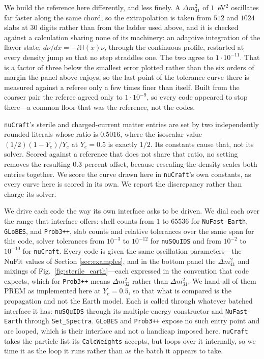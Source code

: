 \documentclass[final,5p,times,twocolumn,sort,compress]{elsarticle}
\newcommand{\fig}{Fig.}
\newcommand{\figu}[1]{\fig~\ref{fig:#1}}
\begin{document}
We build the reference here differently, and less finely.  A $\Delta m^2_{41}$ of $1$~eV$^2$ oscillates far faster along the same chord, so the extrapolation is taken from $512$ and $1024$ slabs at $30$ digits rather than from the ladder used above, and it is checked against a calculation sharing none of its machinery: an adaptive integration of the flavor state, $d\nu/dx = -i \mathbb{H}(x) \nu$, through the continuous profile, restarted at every density jump so that no step straddles one.  The two agree to $1 \cdot 10^{-11}$.  That is a factor of three below the smallest error plotted rather than the six orders of margin the panel above enjoys, so the last point of the tolerance curve there is measured against a referee only a few times finer than itself.  Built from the coarser pair the referee agreed only to $1 \cdot 10^{-9}$, so every code appeared to stop there---a common floor that was the reference, not the codes.

{\tt nuCraft}'s sterile and charged-current matter entries are set by two independently rounded literals whose ratio is $0.5016$, where the isoscalar value $(1/2)(1 - Y_e)/Y_e$ at $Y_e = 0.5$ is exactly $1/2$.  Its constants cause that, not its solver.  Scored against a reference that does not share that ratio, no setting removes the resulting $0.3$ percent offset, because rescaling the density scales both entries together.  We score the curve drawn here in {\tt nuCraft}'s own constants, as every curve here is scored in its own.  We report the discrepancy rather than charge its solver.

We drive each code the way its own interface asks to be driven.  We dial each over the range that interface offers: shell counts from $1$ to $65536$ for {\tt NuFast-Earth}, {\tt GLoBES}, and {\tt Prob3++}, slab counts and relative tolerances over the same span for this code, solver tolerances from $10^{-3}$ to $10^{-12}$ for {\tt nuSQuIDS} and from $10^{-2}$ to $10^{-10}$ for {\tt nuCraft}.  Every code is given the same oscillation parameters---the NuFit values of Section \ref{sec:examples}, and in the bottom panel the $\Delta m^2_{41}$ and mixings of \figu{sterile_earth}---each expressed in the convention that code expects, which for {\tt Prob3++} means $\Delta m^2_{32}$ rather than $\Delta m^2_{31}$.  We hand all of them PREM as implemented here at $Y_e = 0.5$, so that what is compared is the propagation and not the Earth model.  Each is called through whatever batched interface it has: {\tt nuSQuIDS} through its multiple-energy constructor and {\tt NuFast-Earth} through {\tt Set\_Spectra}.  {\tt GLoBES} and {\tt Prob3++} expose no such entry point and are looped, which is their interface and not a handicap imposed here.  {\tt nuCraft} takes the particle list its {\tt CalcWeights} accepts, but loops over it internally, so we time it as the loop it runs rather than as the batch it appears to take.
\end{document}
